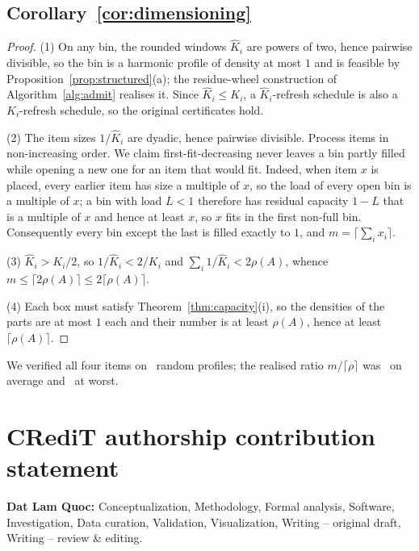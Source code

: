 \documentclass[final,5p,times,twocolumn]{elsarticle}
\theoremstyle{definition}
\newcommand{\dens}{\rho}
\begin{document}
\subsection*{Corollary~\ref{cor:dimensioning}}
\begin{proof}
(1) On any bin, the rounded windows $\hat K_i$ are powers of two, hence pairwise divisible, so the
bin is a harmonic profile of density at most $1$ and is feasible by
Proposition~\ref{prop:structured}(a); the residue-wheel construction of Algorithm~\ref{alg:admit}
realises it. Since $\hat K_i\le K_i$, a $\hat K_i$-refresh schedule is also a $K_i$-refresh
schedule, so the original certificates hold.

(2) The item sizes $1/\hat K_i$ are dyadic, hence pairwise divisible. Process items in
non-increasing order. We claim first-fit-decreasing never leaves a bin partly filled while opening
a new one for an item that would fit. Indeed, when item $x$ is placed, every earlier item has size
a multiple of $x$, so the load of every open bin is a multiple of $x$; a bin with load $L<1$
therefore has residual capacity $1-L$ that is a multiple of $x$ and hence at least $x$, so $x$
fits in the first non-full bin. Consequently every bin except the last is filled exactly to $1$,
and $m=\lceil\sum_i x_i\rceil$.

(3) $\hat K_i>K_i/2$, so $1/\hat K_i<2/K_i$ and $\sum_i 1/\hat K_i<2\dens(A)$, whence
$m\le\lceil 2\dens(A)\rceil\le 2\lceil\dens(A)\rceil$.

(4) Each box must satisfy Theorem~\ref{thm:capacity}(i), so the densities of the parts are at most
$1$ each and their number is at least $\dens(A)$, hence at least $\lceil\dens(A)\rceil$.
\end{proof}

\noindent
We verified all four items on \numCfourTrials\ random profiles; the realised ratio
$m/\lceil\dens\rceil$ was \numCfourRatioMean\ on average and \numCfourRatioMax\ at worst.


\section*{CRediT authorship contribution statement}
\textbf{Dat Lam Quoc:} Conceptualization, Methodology, Formal analysis, Software, Investigation,
Data curation, Validation, Visualization, Writing -- original draft, Writing -- review \& editing.
\end{document}
